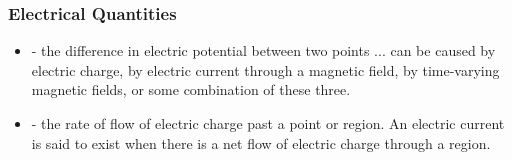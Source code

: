 \documentclass[fleqn]{beamer} %
\newcommand{\sectionIsubsectionIItitle}{Electrical Quantities}
\begin{document}
			\begin{frame}
				\frametitle{\sectionIsubsectionIItitle}

				\begin{itemize}

					
					\item {\PR \BL\underline{\hspace{30mm}}} - the difference in electric potential between two points ... can be caused by electric charge, by electric current through a magnetic field, by time-varying magnetic fields, or some combination of these three.
					
					\item {\RD \BL\underline{\hspace{30mm}}} - the rate of flow of electric charge past a point or region. An electric current is said to exist when there is a net flow of electric charge through a region.

				\end{itemize}	

			\end{frame}
\end{document}

